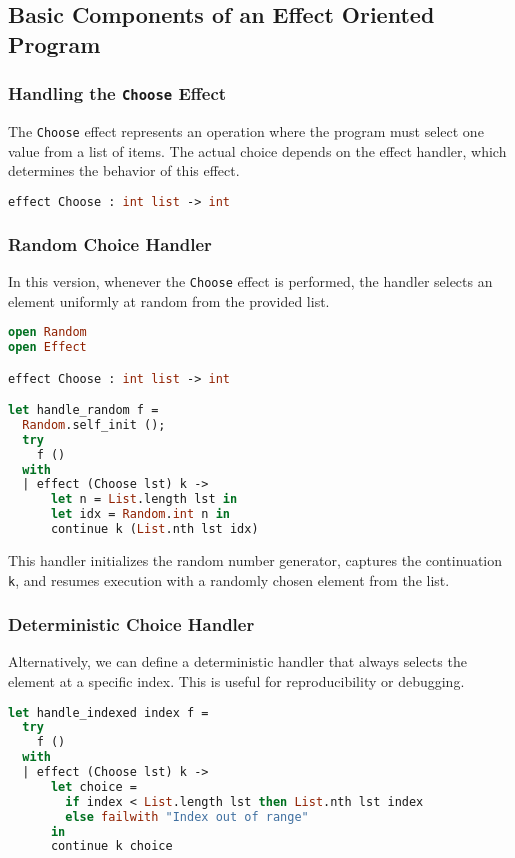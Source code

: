 \documentclass[logo,bsc,singlespacing,parskip,online]{infthesis}
\begin{document}
\subsection{Basic Components of an Effect Oriented Program}


\subsubsection{{Handling the \texttt{Choose} Effect}}

The \texttt{Choose} effect represents an operation where the program must select one value from a list of items. The actual choice depends on the effect handler, which determines the behavior of this effect.
\begin{lstlisting}[language=OCaml]
effect Choose : int list -> int
\end{lstlisting}

\subsubsection{Random Choice Handler}

In this version, whenever the \texttt{Choose} effect is performed, the handler selects an element uniformly at random from the provided list.

\begin{lstlisting}[language=OCaml]
open Random
open Effect

effect Choose : int list -> int

let handle_random f =
  Random.self_init ();
  try
    f ()
  with
  | effect (Choose lst) k ->
      let n = List.length lst in
      let idx = Random.int n in
      continue k (List.nth lst idx)
\end{lstlisting}

This handler initializes the random number generator, captures the continuation \texttt{k}, and resumes execution with a randomly chosen element from the list.

\subsubsection{Deterministic Choice Handler}

Alternatively, we can define a deterministic handler that always selects the element at a specific index. This is useful for reproducibility or debugging.

\begin{lstlisting}[language=OCaml]
let handle_indexed index f =
  try
    f ()
  with
  | effect (Choose lst) k ->
      let choice =
        if index < List.length lst then List.nth lst index
        else failwith "Index out of range"
      in
      continue k choice
\end{lstlisting}
\end{document}
